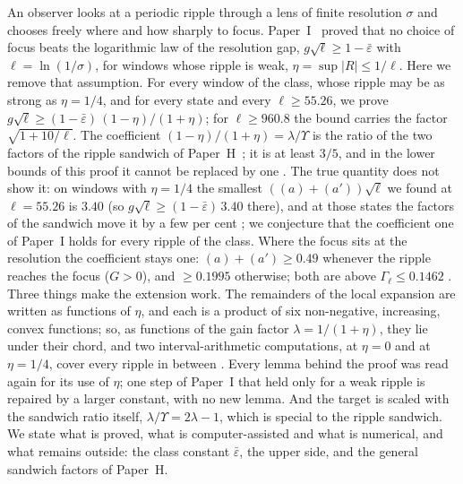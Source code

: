 An observer looks at a periodic ripple through a lens of finite resolution $\sigma$ and chooses freely where and how sharply to focus.
Paper~I~\cite{I} proved that no choice of focus beats the logarithmic law of the resolution gap, $g\sqrt\ell\ge1-\bar\varepsilon$ with $\ell=\ln(1/\sigma)$, for windows whose ripple is weak, $\eta=\sup|R|\le1/\ell$.
Here we remove that assumption.
For every window of the class, whose ripple may be as strong as $\eta=1/4$, and for every state and every $\ell\ge55.26$, we prove
$g\sqrt\ell\ge(1-\bar\varepsilon)\,(1-\eta)/(1+\eta)$; for $\ell\ge960.8$ the bound carries the factor $\sqrt{1+10/\ell}$.
The coefficient $(1-\eta)/(1+\eta)=\lambda/\Upsilon$ is the ratio of the two factors of the ripple sandwich of Paper~H~\cite{H}; it is at least $3/5$, and in the lower bounds of this proof it cannot be replaced by one \numst.
The true quantity does not show it: on windows with $\eta=1/4$ the smallest $((a)+(a'))\sqrt\ell$ we found at $\ell=55.26$ is $3.40$ (so $g\sqrt\ell\ge(1-\bar\varepsilon)\,3.40$ there), and at those states the factors of the sandwich move it by a few per cent \numst; we conjecture that the coefficient one of Paper~I holds for every ripple of the class.
Where the focus sits at the resolution the coefficient stays one: $(a)+(a')\ge0.49$ whenever the ripple reaches the focus ($G>0$), and $\ge0.1995$ otherwise; both are above $\Gamma_\ell\le0.1462$ \proofst.
Three things make the extension work.
The remainders of the local expansion are written as functions of $\eta$, and each is a product of six non-negative, increasing, convex functions; so, as functions of the gain factor $\lambda=1/(1+\eta)$, they lie under their chord, and two interval-arithmetic computations, at $\eta=0$ and at $\eta=1/4$, cover every ripple in between .
Every lemma behind the proof was read again for its use of $\eta$; one step of Paper~I that held only for a weak ripple is repaired by a larger constant, with no new lemma.
And the target is scaled with the sandwich ratio itself, $\lambda/\Upsilon=2\lambda-1$, which is special to the ripple sandwich.
We state what is proved, what is computer-assisted and what is numerical, and what remains outside: the class constant $\bar\varepsilon$, the upper side, and the general sandwich factors of Paper~H.
